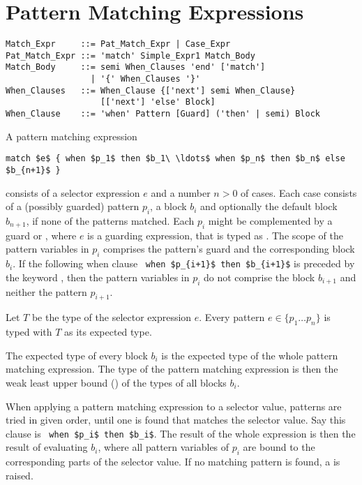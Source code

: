 \section{Pattern Matching Expressions}

\syntax\begin{lstlisting}
Match_Expr     ::= Pat_Match_Expr | Case_Expr
Pat_Match_Expr ::= 'match' Simple_Expr1 Match_Body
Match_Body     ::= semi When_Clauses 'end' ['match']
                 | '{' When_Clauses '}'
When_Clauses   ::= When_Clause {['next'] semi When_Clause} 
                   [['next'] 'else' Block]
When_Clause    ::= 'when' Pattern [Guard] ('then' | semi) Block
\end{lstlisting}

A pattern matching expression 
\begin{lstlisting}
match $e$ { when $p_1$ then $b_1\ \ldots$ when $p_n$ then $b_n$ else $b_{n+1}$ }
\end{lstlisting}
consists of a selector expression $e$ and a number $n > 0$ of cases. Each case consists of a (possibly guarded) pattern $p_i$, a block $b_i$ and optionally the default block $b_{n+1}$, if none of the patterns matched. Each $p_i$ might be complemented by a guard  or , where $e$ is a guarding expression, that is typed as . The scope of the pattern variables in $p_i$ comprises the pattern's guard and the corresponding block $b_i$. If the following when clause ~\lstinline!when $p_{i+1}$ then $b_{i+1}$! is preceded by the keyword , then the pattern variables in $p_i$ do not comprise the block $b_{i+1}$ and neither the pattern $p_{i+1}$. 

Let $T$ be the type of the selector expression $e$. Every pattern $e \in \{ p_1 \ldots p_n \}$ is typed with $T$ as its expected type. 

The expected type of every block $b_i$ is the expected type of the whole pattern matching expression. The type of the pattern matching expression is then the weak least upper bound () of the types of all blocks $b_i$. 

When applying a pattern matching expression to a selector value, patterns are tried in given order, until one is found that matches the selector value. Say this  clause is ~\lstinline!when $p_i$ then $b_i$!. The result of the whole expression is then the result of evaluating $b_i$, where all pattern variables of $p_i$ are bound to the corresponding parts of the selector value. If no matching pattern is found, a  is raised. 

